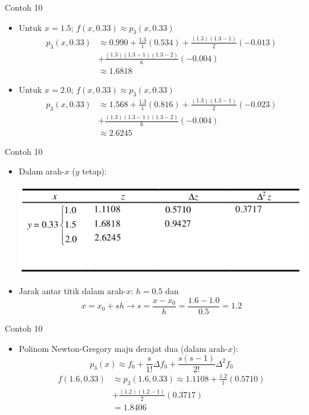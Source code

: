 \documentclass[pdflatex,compress,mathserif]{beamer}
\begin{document}
\begin{frame}{Contoh 10}
	\begin{itemize}
		\item Untuk $ x = 1.5 $; $ f(x, 0.33) \approx p_3(x, 0.33) $
		\begin{align*}
			p_3(x,0.33) &\approx 0.990 + \frac{1.3}{1}(0.534) + \frac{(1.3)(1.3-1)}{2}(-0.013)\\
			&+ \frac{(1.3)(1.3-1)(1.3-2)}{6}(-0.004) \\
			& \approx 1.6818
		\end{align*}
		\item Untuk $ x = 2.0 $; $ f(x, 0.33) \approx p_3(x, 0.33) $
		\begin{align*}
			p_3(x,0.33) &\approx 1.568 + \frac{1.3}{1}(0.816) + \frac{(1.3)(1.3-1)}{2}(-0.023)\\
			&+ \frac{(1.3)(1.3-1)(1.3-2)}{6}(-0.004) \\
			& \approx 2.6245
		\end{align*}
	\end{itemize}
\end{frame}

\begin{frame}{Contoh 10}
	\begin{itemize}
		\item Dalam arah-$ x $ ($ y $ tetap):
		\begin{center}
			\includegraphics[width=0.8\linewidth]{img/img31}
		\end{center}
		\item Jarak antar titik dalam arah-$ x $: $ h = 0.5 $ dan \[ x = x_0 + sh \rightarrow s = \frac{x-x_0}{h} = \frac{1.6 - 1.0}{0.5} = 1.2 \]
	\end{itemize}
\end{frame}

\begin{frame}{Contoh 10}
	\begin{itemize}
		\item Polinom Newton-Gregory maju derajat dua (dalam arah-$ x $):
		\[ p_3(x) \approx f_0 + \frac{s}{1!}\Delta f_0 + \frac{s(s-1)}{2!} \Delta^2 f_0 \]
		\begin{align*}
			f(1.6, 0.33) &\approx p_3(1.6, 0.33) \approx 1.1108 + \frac{1.2}{1}(0.5710)\\
			&+ \frac{(1.2)(1.2-1)}{2}(0.3717) \\
			&= 1.8406
		\end{align*}
	\end{itemize}
\end{frame}
\end{document}
